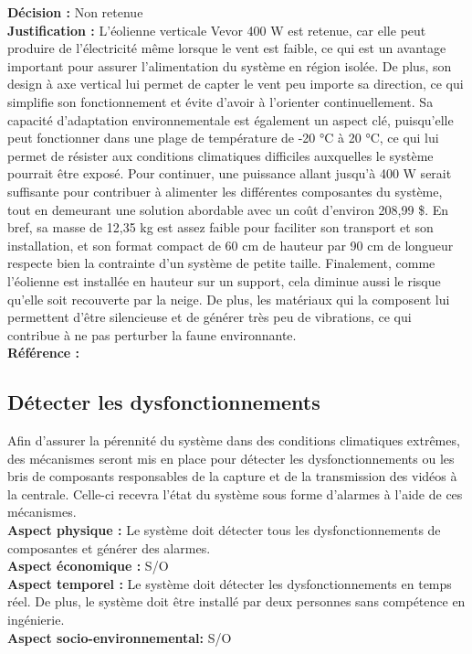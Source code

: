 \noindent
\textbf{Décision :} Non retenue \\

\noindent
\textbf{Justification :} L’éolienne verticale Vevor 400 W est retenue, car elle peut
produire de l’électricité même lorsque le vent est faible, ce qui est un
avantage important pour assurer l’alimentation du système en région isolée. De
plus, son design à axe vertical lui permet de capter le vent peu importe sa
direction, ce qui simplifie son fonctionnement et évite d’avoir à l’orienter
continuellement. Sa capacité d’adaptation environnementale est également un
aspect clé, puisqu’elle peut fonctionner dans une plage de température de -20
°C à 20 °C, ce qui lui permet de résister aux conditions climatiques difficiles
auxquelles le système pourrait être exposé. Pour continuer, une puissance
allant jusqu’à 400 W serait suffisante pour contribuer à alimenter les
différentes composantes du système, tout en demeurant une solution abordable
avec un coût d’environ 208,99 \$. En bref, sa masse de 12,35 kg est assez
faible pour faciliter son transport et son installation, et son format compact
de 60 cm de hauteur par 90 cm de longueur respecte bien la contrainte d’un
système de petite taille. Finalement, comme l’éolienne est installée en hauteur
sur un support, cela diminue aussi le risque qu’elle soit recouverte par la
neige. De plus, les matériaux qui la composent lui permettent d’être
silencieuse et de générer très peu de vibrations, ce qui contribue à ne pas
perturber la faune environnante. \\

\noindent
\textbf{Référence :} \cite{32} \cite{33} \\



\subsection{Détecter les dysfonctionnements}

Afin d'assurer la pérennité du système dans des conditions climatiques
extrêmes, des mécanismes seront mis en place pour détecter les
dysfonctionnements ou les bris de composants responsables de la capture et de
la transmission des vidéos à la centrale. Celle-ci recevra l'état du système
sous forme d'alarmes à l'aide de ces mécanismes. \\

\noindent
\textbf{Aspect physique :} Le système
doit détecter tous les dysfonctionnements de composantes et générer des
alarmes. \\
\textbf{Aspect économique :} S/O \\
\textbf{Aspect temporel :} Le système doit détecter les
dysfonctionnements en temps réel. De plus, le système doit être installé par
deux personnes sans compétence en ingénierie. \\
\textbf{Aspect socio-environnemental:} S/O

